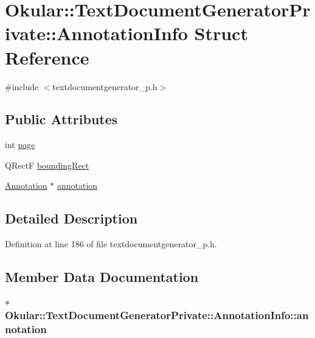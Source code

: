 \hypertarget{structOkular_1_1TextDocumentGeneratorPrivate_1_1AnnotationInfo}{\section{Okular\+:\+:Text\+Document\+Generator\+Private\+:\+:Annotation\+Info Struct Reference}
\label{structOkular_1_1TextDocumentGeneratorPrivate_1_1AnnotationInfo}
}


{\ttfamily \#include $<$textdocumentgenerator\+\_\+p.\+h$>$}

\subsection*{Public Attributes}
\begin{DoxyCompactItemize}
\item 
int \hyperlink{structOkular_1_1TextDocumentGeneratorPrivate_1_1AnnotationInfo_a35a51f7a8d879d6196761cb6f34e2418}{page}
\item 
Q\+Rect\+F \hyperlink{structOkular_1_1TextDocumentGeneratorPrivate_1_1AnnotationInfo_a0114d0b084bc4355896079831c23f327}{bounding\+Rect}
\item 
\hyperlink{classOkular_1_1Annotation}{Annotation} $\ast$ \hyperlink{structOkular_1_1TextDocumentGeneratorPrivate_1_1AnnotationInfo_aaff9d0604ce63a1816473ecf7bcf25e8}{annotation}
\end{DoxyCompactItemize}


\subsection{Detailed Description}


Definition at line 186 of file textdocumentgenerator\+\_\+p.\+h.



\subsection{Member Data Documentation}
\hypertarget{structOkular_1_1TextDocumentGeneratorPrivate_1_1AnnotationInfo_aaff9d0604ce63a1816473ecf7bcf25e8}{
\subsubsection[{annotation}]{$\ast$ Okular\+::\+Text\+Document\+Generator\+Private\+::\+Annotation\+Info\+::annotation}}\label{structOkular_1_1TextDocumentGeneratorPrivate_1_1AnnotationInfo_aaff9d0604ce63a1816473ecf7bcf25e8}


